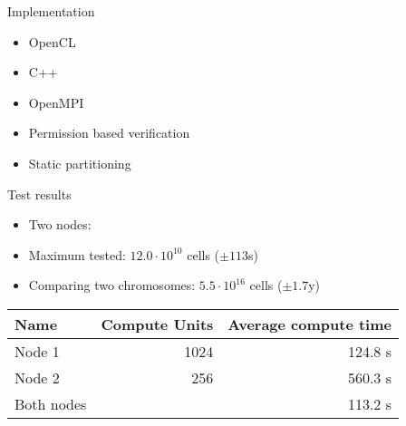 \begin{frame}
    
\end{frame}
\begin{frame}
    
\end{frame}
\begin{frame}
    
\end{frame}
\begin{frame}
    
\end{frame}
\begin{frame}
    
\end{frame}

\begin{frame}{Implementation}
    \begin{itemize}
    	\item OpenCL
        \item C++
        \item OpenMPI
        \item Permission based verification
        \item Static partitioning
    \end{itemize}
\end{frame}


\begin{frame}{Test results}
    \begin{itemize}
        \item Two nodes:
        \item Maximum tested: $12.0\cdot10^{10}$ cells ($\pm 113$s)
        \item Comparing two chromosomes: $5.5\cdot10^{16}$ cells ($\pm 1.7$y)\pause
    \end{itemize}
	\begin{tabular}{l r r}
		\textbf{Name} & \textbf{Compute Units} & \textbf{Average compute time} \\ \hline
		Node 1        & 1024                   & 124.8 s                       \\
		Node 2        & 256                    & 560.3 s                       \\ \hline
		Both nodes    &                        & 113.2 s
	\end{tabular}
\end{frame}



